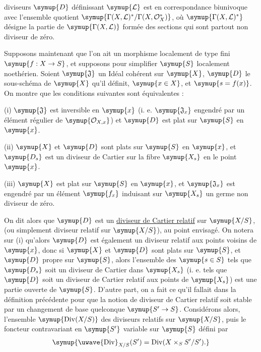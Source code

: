 diviseurs $\symup{D}$ définissant $\symup{\mathcal L}$ est en correspondance biunivoque avec
l'ensemble quotient $\symup{\Gamma(X,\mathcal L)^*/\Gamma(X,\mathcal O_X^*)}$, où $\symup{\Gamma(X,\mathcal L)^*}$ désigne la partie de $\symup{\Gamma(X,\mathcal L)}$ formée
des sections qui sont partout non diviseur de zéro.

Supposons maintenant que l'on ait un morphisme localement de type fini
$\symup{f:X\to S}$, et supposons pour simplifier $\symup{S}$ localement noethérien.
Soient $\symup{\mathfrak J}$ un Idéal cohérent sur $\symup{X}$, $\symup{D}$ le sous-schéma de $\symup{X}$ qu'il
définit, $\symup{x\in X}$, et $\symup{s=f(x)}$. On montre que les conditions suivantes sont
équivalentes :

\noindent (i) $\symup{\mathfrak J}$ est inversible en $\symup{x}$ (i. e. $\symup{\mathfrak J_x}$ engendré
par un élément régulier de $\symup{\mathcal O_{X,x}}$) et $\symup{D}$ est plat sur $\symup{S}$ en $\symup{x}$.

\noindent (ii) $\symup{X}$ et $\symup{D}$ sont plats sur $\symup{S}$ en $\symup{x}$, et $\symup{D_s}$ est un diviseur
de Cartier sur la fibre $\symup{X_s}$ en le point $\symup{x}$.

\noindent (iii) $\symup{X}$ est plat sur $\symup{S}$ en $\symup{x}$, et $\symup{\mathfrak J_x}$ est engendré par
un élément $\symup{f_x}$ induisant sur $\symup{X_s}$ un germe non diviseur de zéro.

On dit alors que $\symup{D}$ est un \uline{diviseur de Cartier relatif} sur $\symup{X/S}$, (ou
simplement diviseur relatif sur $\symup{X/S}$), au point envisagé. On notera sur (i)
qu'alors $\symup{D}$ est également un diviseur relatif aux points voisins de $\symup{x}$, donc
si $\symup{X}$ et $\symup{D}$ sont plats sur $\symup{S}$, et $\symup{D}$ propre sur $\symup{S}$, alors l'ensemble des
$\symup{s\in S}$ tels que $\symup{D_s}$ soit un diviseur de Cartier dans $\symup{X_s}$ (i. e. tels que
$\symup{D}$ soit un diviseur de Cartier relatif aux points de $\symup{X_s}$) est une partie
ouverte de $\symup{S}$. D'autre part, on a fait ce qu'il fallait dans la définition
précédente pour que la notion de diviseur de Cartier relatif soit stable par
un changement de base quelconque $\symup{S'\to S}$. Considérons alors,
l'ensemble $\symup{\operatorname{Div}(X/S)}$ des diviseurs relatifs sur $\symup{X/S}$, puis le
foncteur contravariant en $\symup{S'}$ variable sur $\symup{S}$ défini par
\[
\symup{\text{\uwave{Div}}_{X/S}(S')=
\operatorname{Div}(X\times_SS'/S').}
\]

